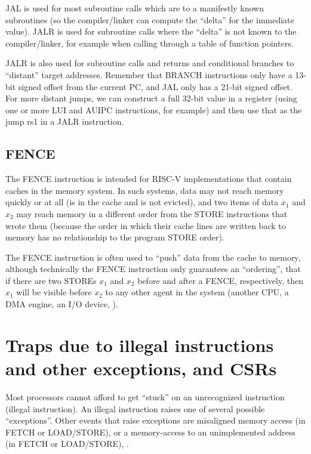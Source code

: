 JAL is used for most subroutine calls which are to a manifestly known
subroutines (so the compiler/linker can compute the ``delta'' for the
immediate value).  JALR is used for subroutine calls where the
``delta'' is not known to the compiler/linker, for example when
calling through a table of function pointers.

JALR is also used for subroutine calls and returns and conditional
branches to ``distant'' target addresses.  Remember that BRANCH
instructions only have a 13-bit signed offset from the current PC, and
JAL only has a 21-bit signed offset.  For more distant jumps, we can
construct a full 32-bit value in a register (using one or more LUI and
AUIPC instructions, for example) and then use that as the jump rs1 in
a JALR instruction.


\subsection{FENCE}

\label{Sec_FENCE}

The FENCE instruction is intended for RISC-V implementations that
contain caches in the memory system.  In such systems, data may not
reach memory quickly or at all (is in the cache and is not evicted),
and two items of data $x_1$ and $x_2$ may reach memory in a different
order from the STORE instructions that wrote them (because the order
in which their cache lines are written back to memory has no
relationship to the program STORE order).

The FENCE instruction is often used to ``push'' data from the cache to
memory, although technically the FENCE instruction only guarantees an
``ordering'', {\ie} that if there are two STOREs $x_1$ and $x_2$
before and after a FENCE, respectively, then $x_1$ will be visible
before $x_2$ to any other agent in the system (another CPU, a DMA
engine, an I/O device, {\etc}).


\section{Traps due to illegal instructions and other exceptions, and CSRs}

\label{Sec_Traps}

Most processors cannot afford to get ``stuck'' on an unrecognized
instruction (illegal instruction).  An illegal instruction raises one
of several possible ``exceptions''.  Other events that raise
exceptions are misaligned memory access (in FETCH or LOAD/STORE), or a
memory-access to an unimplemented address (in FETCH or LOAD/STORE),
{\etc}.

